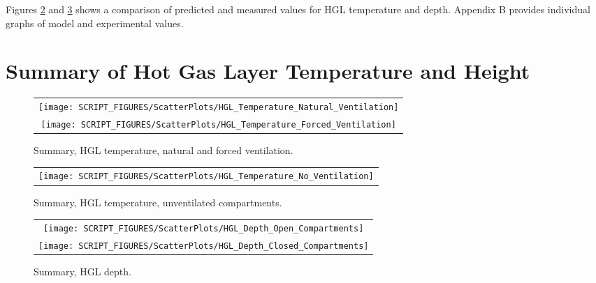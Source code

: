 Figures \ref{fig:HGL_Temperature_Scatter} and \ref{fig:HGL_Height_Scatter} shows a comparison of predicted and measured values for HGL temperature and depth. Appendix B provides individual graphs of model and experimental values.


\section{Summary of Hot Gas Layer Temperature and Height}
\label{HGL Temperature}
\label{HGL Temperature: Natural Ventilation}
\label{HGL Temperature: Forced Ventilation}
\label{HGL Temperature: No Ventilation}
\label{HGL Depth}
\label{HGL Depth: Closed Compartments}
\label{HGL Depth: Open Compartments}

\begin{figure}
\centering
\begin{tabular*}{\textwidth}{c}
\texttt{[image: SCRIPT\_FIGURES/ScatterPlots/HGL\_Temperature\_Natural\_Ventilation]} \\
\texttt{[image: SCRIPT\_FIGURES/ScatterPlots/HGL\_Temperature\_Forced\_Ventilation]} \\
\end{tabular*}
\caption[Summary, HGL temperature, natural and forced ventilation]
{Summary, HGL temperature, natural and forced ventilation.}
\label{fig:HGL_Temperature_Scatter}
\end{figure}


\begin{figure}
\centering
\begin{tabular*}{\textwidth}{c}
\texttt{[image: SCRIPT\_FIGURES/ScatterPlots/HGL\_Temperature\_No\_Ventilation]}
\end{tabular*}
\caption[Summary, HGL temperature, unventilated compartments]
{Summary, HGL temperature, unventilated compartments.}
\label{fig:HGL_Temperature_Scatter}
\end{figure}

\begin{figure}\centering
\begin{tabular*}{\textwidth}{c}
\texttt{[image: SCRIPT\_FIGURES/ScatterPlots/HGL\_Depth\_Open\_Compartments]} \\
\texttt{[image: SCRIPT\_FIGURES/ScatterPlots/HGL\_Depth\_Closed\_Compartments]}
\end{tabular*}
\caption[Summary, HGL depth]
{Summary, HGL depth.}
\label{fig:HGL_Height_Scatter}
\end{figure}

